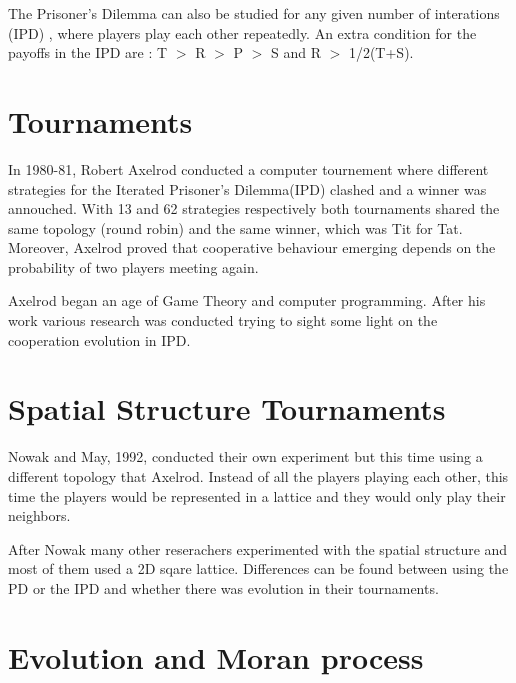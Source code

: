 The Prisoner’s Dilemma can also be studied for any given number of interations (IPD)
, where players play each other repeatedly. An extra condition for the payoffs
in the IPD are : T \(>\) R \(>\) P \(>\) S and R \(>\) 1/2(T+S).

\section{Tournaments}

In 1980-81, Robert Axelrod conducted a computer tournement where different
strategies for the Iterated Prisoner's Dilemma(IPD) clashed and a winner was annouched.
With 13 and 62 strategies respectively both tournaments shared the same topology
(round robin) and the same winner, which was Tit for Tat.
Moreover, Axelrod proved that cooperative behaviour emerging
depends on the probability of two players meeting  again.


Axelrod began an age of Game Theory and computer programming.
After his work various research was conducted trying to sight some light on the
cooperation evolution in IPD.

\section{Spatial Structure Tournaments}

Nowak and May, 1992, conducted their own experiment but this
time using a different topology that Axelrod. Instead of all the players playing
each other, this time the players would be represented in a lattice and they would
only play their neighbors.

After Nowak many other reserachers experimented with the spatial structure and
most of them used a 2D sqare lattice. Differences can be found between using
the PD or the IPD and whether there was evolution in their tournaments.

\section{Evolution and Moran process}
\lipsum[1-10]
